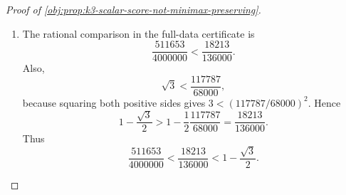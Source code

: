 \begin{proof}[Proof of \cref{obj:prop:k3-scalar-score-not-minimax-preserving}]
\begin{enumerate}
\[
\Xi(000,111,111)=0,
\]
so no smaller constant than \(511653/4000000\) works for this estimator.
Since \(\Xi\ge0\) on all of \((\{0,1\}^3)^3\),
\[
R_F(z)\le \frac{511653}{4000000}
\qquad\text{for every }z\in\mathcal T_3^3 .
\]
For the schedule with response types \((0,0,0),(1,1,1),(1,1,1)\), the target is \(0\), and the same finite sum reduces to
\[
\begin{aligned}
R_F(z)
&=\frac18\left(\frac{183}{1000}\right)^2
+\frac18\left(\frac{638}{1000}\right)^2
+\frac14\left(\frac{199}{1000}\right)^2
+\frac14\left(\frac{167}{1000}\right)^2  \\
&\qquad
+\frac18\left(\frac{648}{1000}\right)^2
+\frac18\left(\frac{167}{1000}\right)^2
=\frac{511653}{4000000}.
\end{aligned}
\]
Therefore the worst-case risk of this full-data rule is exactly \(511653/4000000\). %

\item
The rational comparison in the full-data certificate is
\[
\frac{511653}{4000000}<\frac{18213}{136000}.
\]
Also,
\[
\sqrt3<\frac{117787}{68000},
\]
because squaring both positive sides gives \(3<(117787/68000)^2\). Hence
\[
1-\frac{\sqrt3}{2}
>
1-\frac1{2}\frac{117787}{68000}
=
\frac{18213}{136000}.
\]
Thus
\[
\frac{511653}{4000000}
<
\frac{18213}{136000}
<
1-\frac{\sqrt3}{2}.
\]


\end{enumerate}
\end{proof}
